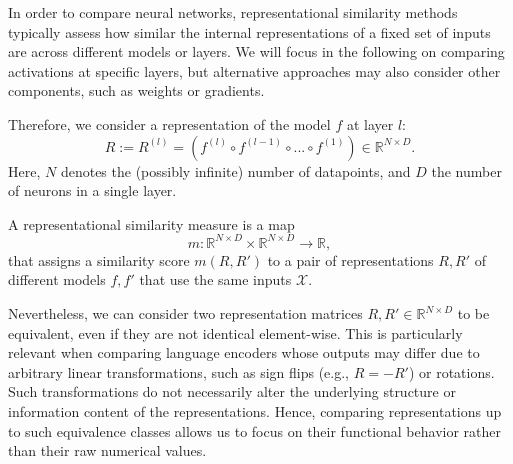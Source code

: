 
In order to compare neural networks, representational similarity methods typically assess how similar the internal representations of a fixed set of inputs are across different models or layers.  
We will focus in the following on comparing activations at specific layers, but alternative approaches may also consider other components, such as weights or gradients.


Therefore, we consider a representation of the model $f$ at layer $l$:
\begin{equation*}
    R:=R^{(l)}=(f^{(l)} \circ f^{(l-1)} \circ ... \circ f^{(1)}) \in \mathbb{R}^{N\times D}.
\end{equation*}
Here, \( N \) denotes the (possibly infinite) number of datapoints, and \( D \) the number of neurons in a single layer.


\begin{definition} A representational similarity measure is a map 
\begin{equation*}
    m: \mathbb{R}^{N\times D} \times \mathbb{R}^{N\times D} \longrightarrow \mathbb{R},
\end{equation*} 
that assigns a similarity score $m(R, R')$ to a pair of representations $R,R'$ of different models $f,f'$ that use the same inputs $\mathcal{X}$.    
\end{definition}

Nevertheless, we can consider two representation matrices \( R, R' \in \mathbb{R}^{N \times D} \) to be equivalent, even if they are not identical element-wise.
This is particularly relevant when comparing language encoders whose outputs may differ due to arbitrary linear transformations, such as sign flips (e.g., \( R = -R' \)) or rotations.
Such transformations do not necessarily alter the underlying structure or information content of the representations.
Hence, comparing representations up to such equivalence classes allows us to focus on their functional behavior rather than their raw numerical values.


